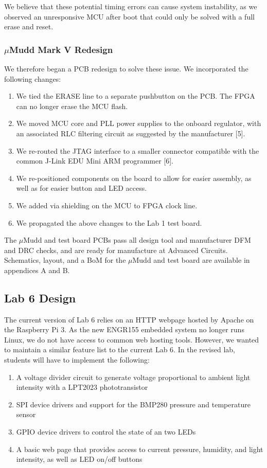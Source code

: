 \documentclass[12pt]{article}
\begin{document}
We believe that these potential timing errors can cause system instability, as we observed an unresponsive MCU after boot that could only be solved with a full erase and reset.

\subsubsection{$\mu$Mudd Mark V Redesign}

We therefore began a PCB redesign to solve these issue. We incorporated the following changes:

\begin{enumerate}
    \item We tied the ERASE line to a separate pushbutton on the PCB. The FPGA can no longer erase the MCU flash.
    \item We moved MCU core and PLL power supplies to the onboard regulator, with an associated RLC filtering circuit as suggested by the manufacturer [5].
    \item We re-routed the JTAG interface to a smaller connector compatible with the common J-Link EDU Mini ARM programmer [6].
    \item We re-positioned components on the board to allow for easier assembly, as well as for easier button and LED access.
    \item We added via shielding on the MCU to FPGA clock line.
    \item We propagated the above changes to the Lab 1 test board.
\end{enumerate}

The $\mu$Mudd and test board PCBs pass all design tool and manufacturer DFM and DRC checks, and are ready for manufacture at Advanced Circuits. Schematics, layout, and a BoM for the $\mu$Mudd and test board are available in appendices A and B.

\subsection{Lab 6 Design}
The current version of Lab 6 relies on an HTTP webpage hosted by Apache on the Raspberry Pi 3. As the new ENGR155 embedded system no longer runs Linux, we do not have access to common web hosting tools. However, we wanted to maintain a similar feature list to the current Lab 6. In the revised lab, students will have to implement the following:

\begin{enumerate}
    \item A voltage divider circuit to generate voltage proportional to ambient light intensity with a LPT2023 phototransistor
    \item SPI device drivers and support for the BMP280 pressure and temperature sensor
    \item GPIO device drivers to control the state of an two LEDs
    \item A basic web page that provides access to current pressure, humidity, and light intensity, as well as LED on/off buttons 
\end{enumerate}
\end{document}
